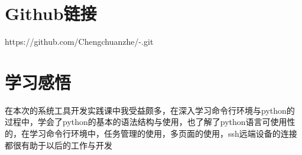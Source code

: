 \documentclass[a4paper, 12pt]{article}
\begin{document}
\section{Github链接}
https://github.com/Chengchuanzhe/-.git
\section{学习感悟}
    在本次的系统工具开发实践课中我受益颇多，在深入学习命令行环境与python的过程中，学会了python的基本的语法结构与使用，也了解了python语言可使用性的，在学习命令行环境中，任务管理的使用，多页面的使用，ssh远端设备的连接都很有助于以后的工作与开发
\end{document}
